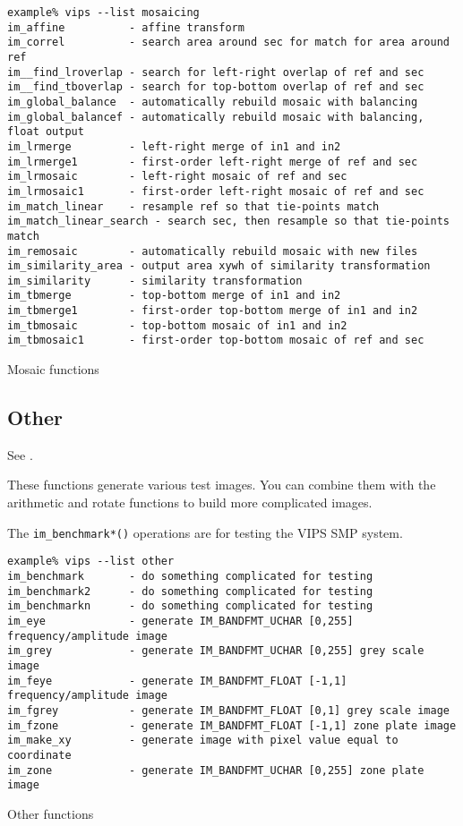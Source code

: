 \begin{fig2}
\begin{verbatim}
example% vips --list mosaicing
im_affine          - affine transform
im_correl          - search area around sec for match for area around ref
im__find_lroverlap - search for left-right overlap of ref and sec
im__find_tboverlap - search for top-bottom overlap of ref and sec
im_global_balance  - automatically rebuild mosaic with balancing
im_global_balancef - automatically rebuild mosaic with balancing, float output
im_lrmerge         - left-right merge of in1 and in2
im_lrmerge1        - first-order left-right merge of ref and sec
im_lrmosaic        - left-right mosaic of ref and sec
im_lrmosaic1       - first-order left-right mosaic of ref and sec
im_match_linear    - resample ref so that tie-points match
im_match_linear_search - search sec, then resample so that tie-points match
im_remosaic        - automatically rebuild mosaic with new files
im_similarity_area - output area xywh of similarity transformation
im_similarity      - similarity transformation
im_tbmerge         - top-bottom merge of in1 and in2
im_tbmerge1        - first-order top-bottom merge of in1 and in2
im_tbmosaic        - top-bottom mosaic of in1 and in2
im_tbmosaic1       - first-order top-bottom mosaic of ref and sec
\end{verbatim}
\caption{Mosaic functions}
\label{fg:mosaicing}
\end{fig2}

\subsection{Other}

See .

These functions generate various test images. You can combine them with
the arithmetic and rotate functions to build more complicated images.

The \verb+im_benchmark*()+ operations are for testing the VIPS SMP system.

\begin{fig2}
\begin{verbatim}
example% vips --list other
im_benchmark       - do something complicated for testing
im_benchmark2      - do something complicated for testing
im_benchmarkn      - do something complicated for testing
im_eye             - generate IM_BANDFMT_UCHAR [0,255] frequency/amplitude image
im_grey            - generate IM_BANDFMT_UCHAR [0,255] grey scale image
im_feye            - generate IM_BANDFMT_FLOAT [-1,1] frequency/amplitude image
im_fgrey           - generate IM_BANDFMT_FLOAT [0,1] grey scale image
im_fzone           - generate IM_BANDFMT_FLOAT [-1,1] zone plate image
im_make_xy         - generate image with pixel value equal to coordinate
im_zone            - generate IM_BANDFMT_UCHAR [0,255] zone plate image
\end{verbatim}
\caption{Other functions}
\label{fg:other}
\end{fig2}

